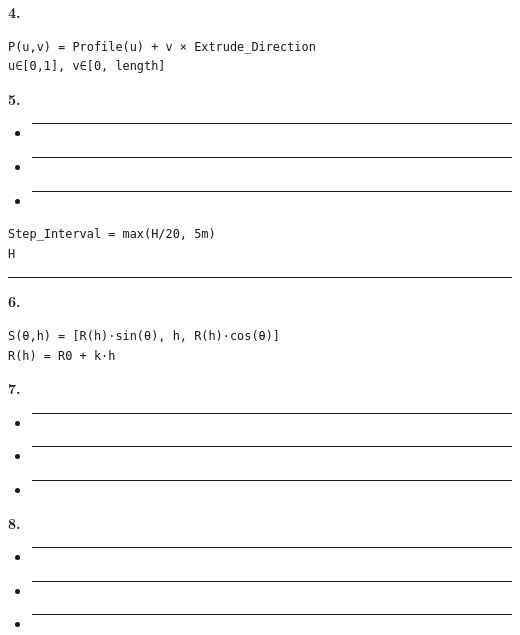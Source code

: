 \textbf{4. }

\begin{verbatim}
P(u,v) = Profile(u) + v × Extrude_Direction
u∈[0,1], v∈[0, length]
\end{verbatim}

\textbf{5. }

\begin{itemize}
\item
  \begin{center}\rule{0.5\linewidth}{0.5pt}\end{center}
\item
  \begin{center}\rule{0.5\linewidth}{0.5pt}\end{center}
\item
  \begin{center}\rule{0.5\linewidth}{0.5pt}\end{center}
\end{itemize}

\begin{verbatim}
Step_Interval = max(H/20, 5m)
H
\end{verbatim}

\begin{center}\rule{0.5\linewidth}{0.5pt}\end{center}

\textbf{6. }

\begin{verbatim}
S(θ,h) = [R(h)·sin(θ), h, R(h)·cos(θ)]
R(h) = R0 + k·h
\end{verbatim}

\textbf{7. }

\begin{itemize}
\item
  \begin{center}\rule{0.5\linewidth}{0.5pt}\end{center}
\item
  \begin{center}\rule{0.5\linewidth}{0.5pt}\end{center}
\item
  \begin{center}\rule{0.5\linewidth}{0.5pt}\end{center}
\end{itemize}

\textbf{8. }

\begin{itemize}
\item
  \begin{center}\rule{0.5\linewidth}{0.5pt}\end{center}
\item
  \begin{center}\rule{0.5\linewidth}{0.5pt}\end{center}
\item
  \begin{center}\rule{0.5\linewidth}{0.5pt}\end{center}
\end{itemize}


